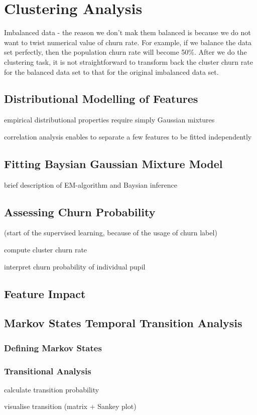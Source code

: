 \section{Clustering Analysis}
\label{sec:clustering}


Imbalanced data - the reason we don't mak them balanced is because we do not want to twist numerical value of churn rate. For example, if we balance the data set perfectly, then the population churn rate will become 50\%. After we do the clustering task, it is not straightforward to transform back the cluster churn rate for the balanced data set to that for the original imbalanced data set.


\subsection{Distributional Modelling of Features}

empirical distributional properties require simply Gaussian mixtures

correlation analysis enables to separate a few features to be fitted independently

\subsection{Fitting Baysian Gaussian Mixture Model}

brief description of EM-algorithm and Baysian inference

\subsection{Assessing Churn Probability}

(start of the supervised learning, because of the usage of churn label)

compute cluster churn rate

interpret churn probability of individual pupil

\subsection{Feature Impact}

\subsection{Markov States Temporal Transition Analysis}

\subsubsection{Defining Markov States}

\subsubsection{Transitional Analysis}

calculate transition probability

visualise transition (matrix + Sankey plot) \cite{hmm2015}